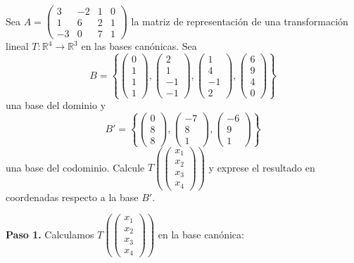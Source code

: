 \begin{prob}
Sea $A = \begin{pmatrix}
3 & -2 & 1 & 0 \\
1 & 6 & 2 & 1 \\
-3 & 0 & 7 & 1
\end{pmatrix}$ la matriz de representación de una transformación lineal $T: \mathbb{R}^4 \rightarrow \mathbb{R}^3$ en las bases canónicas. Sea
\[
B = \left\lbrace
\begin{pmatrix} 0 \\ 1 \\ 1 \\ 1 \end{pmatrix},
\begin{pmatrix} 2 \\ 1 \\ -1 \\ -1 \end{pmatrix},
\begin{pmatrix} 1 \\ 4 \\ -1 \\ 2 \end{pmatrix},
\begin{pmatrix} 6 \\ 9 \\ 4 \\ 0 \end{pmatrix}
\right\rbrace
\]
una base del dominio y
\[
B' = \left\lbrace
\begin{pmatrix} 0 \\ 8 \\ 8 \end{pmatrix},
\begin{pmatrix} -7 \\ 8 \\ 1 \end{pmatrix},
\begin{pmatrix} -6 \\ 9 \\ 1 \end{pmatrix}
\right\rbrace
\]
una base del codominio. Calcule $T\left(\begin{pmatrix} x_1 \\ x_2 \\ x_3 \\ x_4 \end{pmatrix}\right)$ y exprese el resultado en coordenadas respecto a la base $B'$.
\begin{myproof}
\textbf{Paso 1.} Calculamos $T\left(\begin{pmatrix} x_1 \\ x_2 \\ x_3 \\ x_4 \end{pmatrix}\right)$ en la base canónica:

\end{myproof}
\end{prob}
